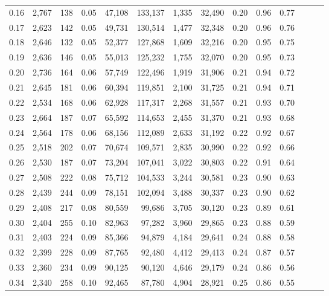 \begin{tabular}{rrrrrrrrrrrrrr}
0.16 &  2,767 &    138 &  0.05 &   47,108 &  133,137 &   1,335 &  32,490 &  0.20 &  0.96 &      0.77 \\
0.17 &  2,623 &    142 &  0.05 &   49,731 &  130,514 &   1,477 &  32,348 &  0.20 &  0.96 &      0.76 \\
0.18 &  2,646 &    132 &  0.05 &   52,377 &  127,868 &   1,609 &  32,216 &  0.20 &  0.95 &      0.75 \\
0.19 &  2,636 &    146 &  0.05 &   55,013 &  125,232 &   1,755 &  32,070 &  0.20 &  0.95 &      0.73 \\
0.20 &  2,736 &    164 &  0.06 &   57,749 &  122,496 &   1,919 &  31,906 &  0.21 &  0.94 &      0.72 \\
0.21 &  2,645 &    181 &  0.06 &   60,394 &  119,851 &   2,100 &  31,725 &  0.21 &  0.94 &      0.71 \\
0.22 &  2,534 &    168 &  0.06 &   62,928 &  117,317 &   2,268 &  31,557 &  0.21 &  0.93 &      0.70 \\
0.23 &  2,664 &    187 &  0.07 &   65,592 &  114,653 &   2,455 &  31,370 &  0.21 &  0.93 &      0.68 \\
0.24 &  2,564 &    178 &  0.06 &   68,156 &  112,089 &   2,633 &  31,192 &  0.22 &  0.92 &      0.67 \\
0.25 &  2,518 &    202 &  0.07 &   70,674 &  109,571 &   2,835 &  30,990 &  0.22 &  0.92 &      0.66 \\
0.26 &  2,530 &    187 &  0.07 &   73,204 &  107,041 &   3,022 &  30,803 &  0.22 &  0.91 &      0.64 \\
0.27 &  2,508 &    222 &  0.08 &   75,712 &  104,533 &   3,244 &  30,581 &  0.23 &  0.90 &      0.63 \\
0.28 &  2,439 &    244 &  0.09 &   78,151 &  102,094 &   3,488 &  30,337 &  0.23 &  0.90 &      0.62 \\
0.29 &  2,408 &    217 &  0.08 &   80,559 &   99,686 &   3,705 &  30,120 &  0.23 &  0.89 &      0.61 \\
0.30 &  2,404 &    255 &  0.10 &   82,963 &   97,282 &   3,960 &  29,865 &  0.23 &  0.88 &      0.59 \\
0.31 &  2,403 &    224 &  0.09 &   85,366 &   94,879 &   4,184 &  29,641 &  0.24 &  0.88 &      0.58 \\
0.32 &  2,399 &    228 &  0.09 &   87,765 &   92,480 &   4,412 &  29,413 &  0.24 &  0.87 &      0.57 \\
0.33 &  2,360 &    234 &  0.09 &   90,125 &   90,120 &   4,646 &  29,179 &  0.24 &  0.86 &      0.56 \\
0.34 &  2,340 &    258 &  0.10 &   92,465 &   87,780 &   4,904 &  28,921 &  0.25 &  0.86 &      0.55 \\

\end{tabular}
